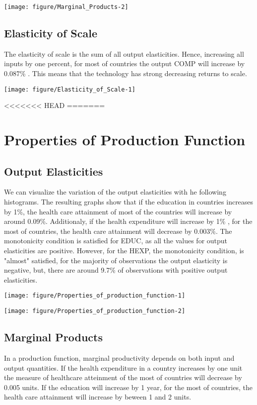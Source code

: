 \documentclass[12pt,a4paper]{article}\usepackage[]{graphicx}\usepackage[]{color}
\makeatletter
\def\maxwidth{ %
  \ifdim\Gin@nat@width>\linewidth
    \linewidth
  \else
    \Gin@nat@width
  \fi
}
\makeatother
\begin{document}
\texttt{[image: figure/Marginal\_Products-2]} 


\subsection{Elasticity of Scale}
The elasticity of scale is the sum of all output elasticities. Hence, increasing all  inputs by one percent, for most of countries
the output COMP will increase by 0.087\% .
This means that the technology has strong decreasing returns to scale.

\texttt{[image: figure/Elasticity\_of\_Scale-1]} 

<<<<<<< HEAD
=======
\section{Properties of Production Function}

\subsection{Output Elasticities}

We can visualize the variation of the output elasticities with he following histograms. The resulting graphs show that if the education in countries increases 
 by 1\%, the health care attainment of most of the countries 
will increase by around 0.09\%. Additionaly, if the health expenditure will increase by 1\% , for the most of  
countries, the health care attainment will decrease by 0.003\%.
The monotonicity condition is satisfied for EDUC, as all the values for output elasticities
are positive.
However, for the HEXP, the monotonicity condition, is "almost" satisfied, 
for the majority of observations the output elasticity is negative, but, there are
around 9.7\% of observations with positive output elasticities. 

\texttt{[image: figure/Properties\_of\_production\_function-1]} 

\texttt{[image: figure/Properties\_of\_production\_function-2]} 

\subsection{Marginal Products}
In a production function, marginal productivity depends on both input and output 
quantities.
If the health expenditure in a country increases  by one unit 
the measure of healthcare atteinment of the most of countries 
will decrease by 0.005 units.
If the education will increase by 1 year, for the most of  countries, the 
health care attainment will increase by beween 1 and 2 units.
\end{document}
